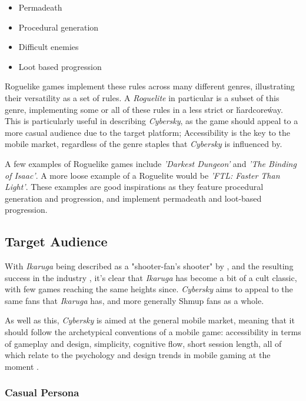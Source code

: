 \documentclass{scrartcl}
\let\cite\textcite
\let\citep\autocite
\begin{document}
\begin{itemize}
  \item Permadeath
  \item Procedural generation
  \item Difficult enemies
  \item Loot based progression
\end{itemize}

Roguelike games implement these rules across many different genres, illustrating their versatility as a set of rules. A \emph{Roguelite} in particular is a subset of this genre, implementing some or all of these rules in a less strict or \'hardcore\' way. This is particularly useful in describing \emph{Cybersky}, as the game should appeal to a more casual audience due to the target platform; Accessibility is the key to the mobile market, regardless of the genre staples that \emph{Cybersky} is influenced by.

A few examples of Roguelike games include \emph{'Darkest Dungeon'} and \emph{'The Binding of Isaac'}. A more loose example of a Roguelite would be \emph{'FTL: Faster Than Light'}. These examples are good inspirations as they feature procedural generation and progression, and implement permadeath and loot-based progression.

\subsection{Target Audience}

With \emph{Ikaruga} being described as a "shooter-fan's shooter" by \cite{Rodriguez2018}, and the resulting success in the industry \citep{BrianW2020-01}, it's clear that \emph{Ikaruga} has become a bit of a cult classic, with few games reaching the same heights since. \emph{Cybersky} aims to appeal to the same fans that \emph{Ikaruga} has, and more generally Shmup fans as a whole.

As well as this, \emph{Cybersky} is aimed at the general mobile market, meaning that it should follow the archetypical conventions of a mobile game: accessibility in terms of gameplay and design, simplicity, cognitive flow, short session length, all of which relate to the psychology and design trends in mobile gaming at the moment \citep{Northington2018}.

\subsubsection{Casual Persona}
\end{document}
